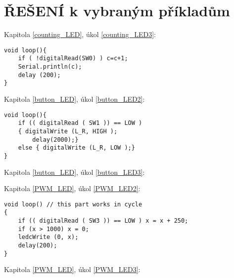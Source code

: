\documentclass[12pt]{article}
\begin{document}
\newpage
\section{ŘEŠENÍ k vybraným příkladům}

Kapitola \ref{counting_LED}, úkol \ref{counting_LED3}:
\begin{lstlisting}
void loop(){
	if ( !digitalRead(SW0) ) c=c+1;
	Serial.println(c);
	delay (200);
}
\end{lstlisting}  %

\hrulefill


Kapitola \ref{button_LED}, úkol \ref{button_LED2}:
\begin{lstlisting}
void loop(){
	if (( digitalRead ( SW1 )) == LOW )
	{ digitalWrite (L_R, HIGH );
		delay(2000);}
	else { digitalWrite (L_R, LOW );}
}
\end{lstlisting} 

\hrulefill

Kapitola \ref{button_LED}, úkol \ref{button_LED3}:


\hrulefill

Kapitola \ref{PWM_LED}, úkol \ref{PWM_LED2}:
\begin{lstlisting}
void loop() // this part works in cycle
{  
	if (( digitalRead ( SW3 )) == LOW ) x = x + 250;
	if (x > 1000) x = 0;
	ledcWrite (0, x);
	delay(200);
}
\end{lstlisting}

\hrulefill

Kapitola \ref{PWM_LED}, úkol \ref{PWM_LED3}:

\end{document}

